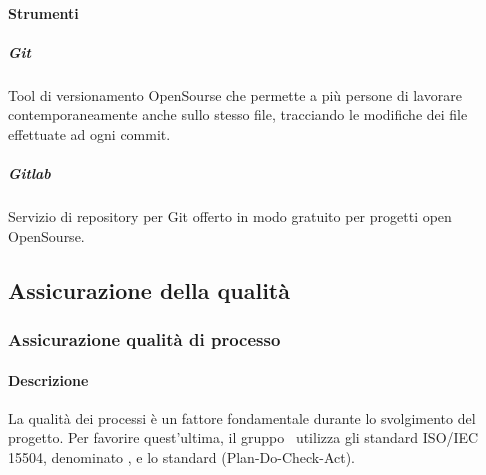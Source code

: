 \documentclass[../NormeDiProgetto_v3.0.0.tex]{subfiles}
\begin{document}
				\paragraph{Strumenti}
					\subparagraph{Git}
						Tool di versionamento OpenSourse che permette a più persone di lavorare contemporaneamente anche sullo stesso file, tracciando le modifiche dei file effettuate ad ogni commit.
					\subparagraph{Gitlab}
						Servizio di repository per Git offerto in modo gratuito per progetti open OpenSourse.

		\subsection{Assicurazione della qualità}
			\subsubsection{Assicurazione qualità di processo}
			\paragraph{Descrizione}
			La qualità dei processi è un fattore fondamentale durante lo svolgimento del progetto. Per favorire quest'ultima, il gruppo \kpanic\ utilizza gli standard ISO/IEC 15504, denominato , e lo standard  (Plan-Do-Check-Act).
\end{document}
